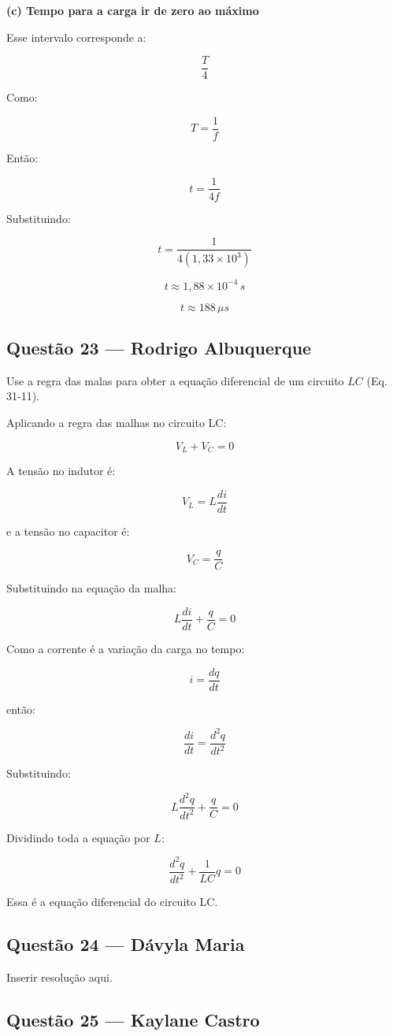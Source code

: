 \documentclass[12pt,a4paper]{article}
\begin{document}
\textbf{(c) Tempo para a carga ir de zero ao máximo}

Esse intervalo corresponde a:

\[
\frac{T}{4}
\]

Como:

\[
T = \frac{1}{f}
\]

Então:

\[
t = \frac{1}{4f}
\]

Substituindo:

\[
t = \frac{1}{4(1,33 \times 10^{3})}
\]

\[
t \approx 1,88 \times 10^{-4}\,s
\]

\[
\boxed{t \approx 188\,\mu s}
\]

\subsection{Questão 23 — Rodrigo Albuquerque}

Use a regra das malas para obter a equação diferencial de um circuito $LC$ (Eq. 31-11).  


Aplicando a regra das malhas no circuito LC:

\[
V_L+V_C=0
\]

A tensão no indutor é:

\[
V_L=L\frac{di}{dt}
\]

e a tensão no capacitor é:

\[
V_C=\frac{q}{C}
\]

Substituindo na equação da malha:

\[
L\frac{di}{dt}+\frac{q}{C}=0
\]

Como a corrente é a variação da carga no tempo:

\[
i=\frac{dq}{dt}
\]

então:

\[
\frac{di}{dt}=\frac{d^2q}{dt^2}
\]

Substituindo:

\[
L\frac{d^2q}{dt^2}+\frac{q}{C}=0
\]

Dividindo toda a equação por \(L\):

\[
\frac{d^2q}{dt^2}+\frac{1}{LC}q=0
\]

Essa é a equação diferencial do circuito LC.


\subsection{Questão 24 — Dávyla Maria}
Inserir resolução aqui.

\subsection{Questão 25 — Kaylane Castro}
\end{document}
